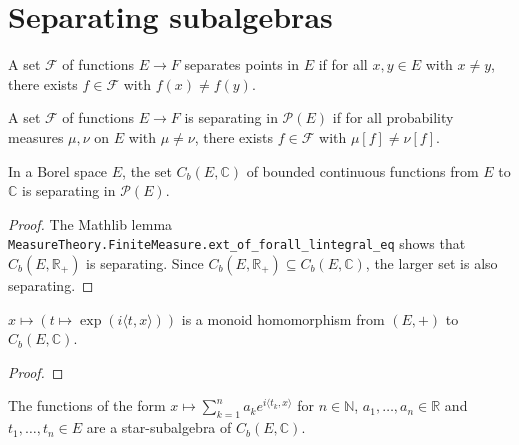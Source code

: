 \chapter{Separating subalgebras}

\begin{definition}\label{def:separates_points}
 \leanok
A set $\mathcal F$ of functions $E \to F$ separates points in $E$ if for all $x, y \in E$ with $x \ne y$, there exists $f \in \mathcal F$ with $f(x) \ne f(y)$.
\end{definition}

\begin{definition}\label{def:separating}
 \leanok
A set $\mathcal F$ of functions $E \to F$ is separating in $\mathcal P(E)$ if for all probability measures $\mu, \nu$ on $E$ with $\mu \ne \nu$, there exists $f \in \mathcal F$ with $\mu[f] \ne \nu[f]$.
\end{definition}


\begin{lemma}\label{lem:bounded_continuous_separating}
In a Borel space $E$, the set $C_b(E, \mathbb{C})$ of bounded continuous functions from $E$ to $\mathbb{C}$ is separating in $\mathcal P(E)$.
\end{lemma}

\begin{proof}
The Mathlib lemma \texttt{MeasureTheory.FiniteMeasure.ext\_of\_forall\_lintegral\_eq} shows that $C_b(E, \mathbb{R}_+)$ is separating. Since $C_b(E, \mathbb{R}_{+}) \subseteq C_b(E, \mathbb{C})$, the larger set is also separating.
\end{proof}


\begin{lemma}\label{lem:exp_character}
 \leanok
$x \mapsto (t \mapsto \exp(i \langle t, x \rangle))$ is a monoid homomorphism from $(E,+)$ to $C_b(E, \mathbb{C})$.
\end{lemma}

\begin{proof}\leanok
\end{proof}


\begin{lemma}\label{lem:starSubalgebra_expPoly}
 \leanok
The functions of the form $x \mapsto \sum_{k=1}^n a_k e^{i\langle t_k, x\rangle}$ for $n \in \mathbb{N}$, $a_1, \ldots, a_n \in \mathbb{R}$ and $t_1, \ldots, t_n \in E$ are a star-subalgebra of $C_b(E, \mathbb{C})$. 
\end{lemma}


